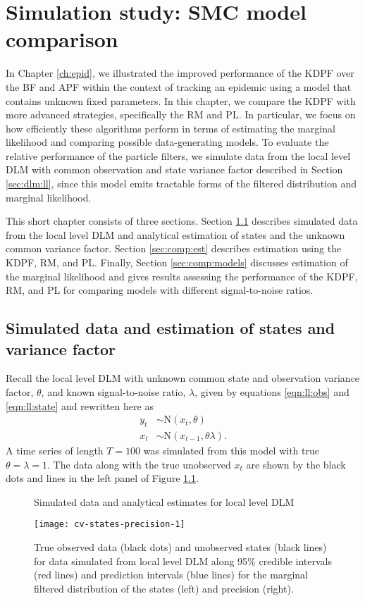 \chapter{Simulation study: SMC model comparison \label{ch:comp}}

In Chapter \ref{ch:epid}, we illustrated the improved performance of the KDPF over the BF and APF within the context of tracking an epidemic using a model that contains unknown fixed parameters. In this chapter, we compare the KDPF with more advanced strategies, specifically the RM and PL. In particular, we focus on how efficiently these algorithms perform in terms of estimating the marginal likelihood and comparing possible data-generating models. To evaluate the relative performance of the particle filters, we simulate data from the local level DLM with common observation and state variance factor described in Section \ref{sec:dlm:ll}, since this model emits tractable forms of the filtered distribution and marginal likelihood.

This short chapter consists of three sections. Section \ref{sec:comp:data} describes simulated data from the local level DLM and analytical estimation of states and the unknown common variance factor. Section \ref{sec:comp:est} describes estimation using the KDPF, RM, and PL. Finally, Section \ref{sec:comp:models} discusses estimation of the marginal likelihood and gives results assessing the performance of the KDPF, RM, and PL for comparing models with different signal-to-noise ratios.

\section{Simulated data and estimation of states and variance factor} \label{sec:comp:data}

Recall the local level DLM with unknown common state and observation variance factor, $\theta$, and known signal-to-noise ratio, $\lambda$, given by equations \eqref{eqn:ll:obs} and \eqref{eqn:ll:state} and rewritten here as
\begin{align*}
y_t &\sim \mbox{N}(x_t, \theta) \\
x_t &\sim \mbox{N}(x_{t-1}, \theta\lambda).
\end{align*}
A time series of length $T = 100$ was simulated from this model with true $\theta = \lambda = 1$. The data along with the true unobserved $x_t$ are shown by the black dots and lines in the left panel of Figure \ref{fig:comp:data}.
 
\begin{figure}[ht]
\ssp
\centering
\caption{Simulated data and analytical estimates for local level DLM} \label{fig:comp:data}
\texttt{[image: cv-states-precision-1]}
\caption*{True observed data (black dots) and unobserved states (black lines) for data simulated from local level DLM along 95\% credible intervals (red lines) and prediction intervals (blue lines) for the marginal filtered distribution of the states (left) and precision (right).}
\end{figure}
 
